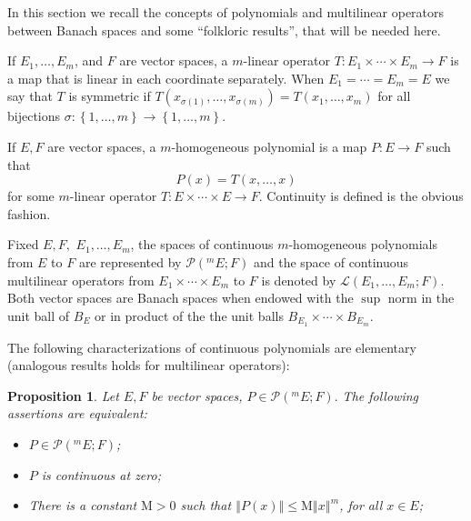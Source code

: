 \documentclass[10pt]{amsart}
\newtheorem{proposition}[theorem]{Proposition}
\numberwithin{equation}{section}
\begin{document}
In this section we recall the concepts of polynomials and multilinear
operators between Banach spaces and some ``folkloric results'', that will be
needed here.

If $E_{1},\ldots,E_{m}$, and $F$ are vector spaces, a $m$-linear operator $T:E_{1}\times \cdots \times E_{m}\rightarrow F$ is a map that is linear in
each coordinate separately. When $E_{1}=\cdots =E_{m}=E$ we say that $T$ is
symmetric if $T(x_{\sigma (1)}, \ldots ,x_{\sigma (m)})=T(x_{1}, \ldots
,x_{m})$ for all bijections $\sigma :\left\{ 1, \ldots ,m\right\}
\rightarrow \left\{ 1, \ldots ,m\right\} .$

If $E,F$ are vector spaces, a $m$-homogeneous polynomial is a map $P:E\rightarrow F$ such that\begin{equation*}
P(x)=T(x, \ldots ,x)
\end{equation*}for some $m$-linear operator $T:E\times \cdots \times E\rightarrow F.$
Continuity is defined is the obvious fashion.

Fixed $E,F,$ $E_{1}, \ldots ,E_{m}$, the spaces of continuous $m$-homogeneous polynomials from $E$ to $F$ are represented by $\mathcal{P}\left( ^{m}E;F\right) $ and the space of continuous multilinear operators
from $E_{1}\times \cdots \times E_{m}$ to $F$ is denoted by $\mathcal{L}\left( E_{1}, \ldots ,E_{m};F\right) .$ Both vector spaces are Banach spaces
when endowed with the $\sup $ norm in the unit ball of $B_{E}$ or in product
of the the unit balls $B_{E_{1}}\times \cdots \times B_{E_{m}}.$

The following characterizations of continuous polynomials are elementary
(analogous results holds for multilinear operators):

\begin{proposition}
\label{20}Let $E,F$ be vector spaces, $P\in \mathcal{P}\left(
^{m}E;F\right). $ The following assertions are equivalent:

\begin{itemize}
\item[(i)] $P\in \mathcal{P}\left( ^{m}E;F\right) $;

\item[(ii)] $P$ is continuous at zero;

\item[(iii)] There is a constant $\mathrm{M}>0$ such that $\left\Vert
P\left( x\right) \right\Vert \leq \mathrm{M}\left\Vert x\right\Vert ^{m}$,
for all $x\in E$;
\end{itemize}
\end{proposition}
\end{document}
